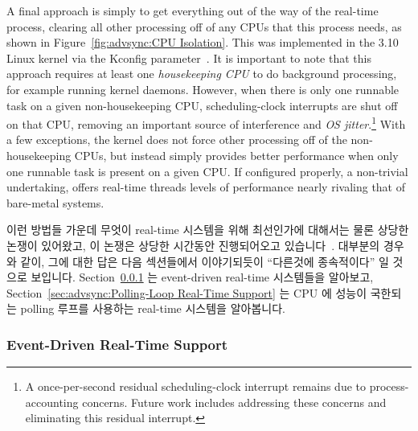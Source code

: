 A final approach is simply to get everything out of the way of the
real-time process, clearing all other processing off of any CPUs that
this process needs, as shown in Figure~\ref{fig:advsync:CPU Isolation}.
This was implemented in the 3.10 Linux kernel via the 
Kconfig parameter~\cite{FredericWeisbecker2013nohz}.
It is important to note that this approach requires at least one
\emph{housekeeping CPU} to do background processing, for example running
kernel daemons.
However, when there is only one runnable task on a given non-housekeeping CPU,
scheduling-clock interrupts are shut off on that CPU, removing an important
source of interference and \emph{OS jitter}.\footnote{
	A once-per-second residual scheduling-clock interrupt remains
	due to process-accounting concerns.
	Future work includes addressing these concerns and eliminating
	this residual interrupt.}
With a few exceptions, the kernel does not force other processing off of the
non-housekeeping CPUs, but instead simply provides better performance
when only one runnable task is present on a given CPU.
If configured properly, a non-trivial undertaking, 
offers real-time threads levels of performance nearly rivaling that of
bare-metal systems.
\fi

이런 방법들 가운데 무엇이 real-time 시스템을 위해 최선인가에 대해서는 물론
상당한 논쟁이 있어왔고, 이 논쟁은 상당한 시간동안 진행되어오고
있습니다~\cite{JonCorbet2004RealTimeLinuxPart1,JonCorbet2004RealTimeLinuxPart2}.
대부분의 경우와 같이, 그에 대한 답은 다음 섹션들에서 이야기되듯이 ``다른것에
종속적이다'' 일 것으로 보입니다.
Section~\ref{sec:advsync:Event-Driven Real-Time Support} 는 event-driven
real-time 시스템들을 알아보고,
Section~\ref{sec:advsync:Polling-Loop Real-Time Support} 는 CPU 에 성능이
국한되는 polling 루프를 사용하는 real-time 시스템을 알아봅니다.

\subsubsection{Event-Driven Real-Time Support}
\label{sec:advsync:Event-Driven Real-Time Support}

